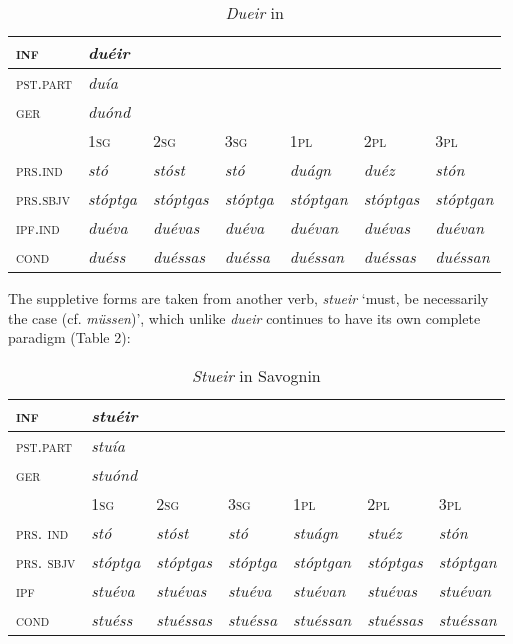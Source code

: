 \documentclass[output=paper,
modfonts
]{LSP/langsci}
\begin{document}
\begin{longtable}[]{@{}lllllll@{}}
\caption{\emph{Dueir} in }\\
\lsptoprule
\textsc{inf} & \emph{duéir} & & & & &\tabularnewline
\midrule
\endhead
\textsc{pst.part} & \emph{duía} & & & & &\tabularnewline
\textsc{ger} & \emph{duónd} & & & & &\tabularnewline
& \textsc{1sg} & \textsc{2sg} & \textsc{3sg} & \textsc{1pl} &
\textsc{2pl} & \textsc{3pl}\tabularnewline
\textsc{prs.ind} & \emph{stó} & \emph{stóst} & \emph{stó} & \emph{duágn}
& \emph{duéz} & \emph{stón}\tabularnewline
\textsc{prs.sbjv} & \emph{stóptga} & \emph{stóptgas} & \emph{stóptga} &
\emph{stóptgan} & \emph{stóptgas} & \emph{stóptgan}\tabularnewline
\textsc{ipf.ind} & \emph{duéva} & \emph{duévas} & \emph{duéva} &
\emph{duévan} & \emph{duévas} & \emph{duévan}\tabularnewline
\textsc{cond} & \emph{duéss} & \emph{duéssas} & \emph{duéssa} &
\emph{duéssan} & \emph{duéssas} & \emph{duéssan}\tabularnewline
\bottomrule
\end{longtable}

The suppletive forms are taken from another verb, \emph{stueir} `must,
be necessarily the case (cf.  \emph{müssen})', which unlike
\emph{dueir} continues to have its own complete paradigm (Table 2):


\begin{longtable}[]{@{}lllllll@{}}
\caption{\emph{Stueir} in Savognin}\\
\lsptoprule
\textsc{inf} & \emph{stuéir} & & & & &\tabularnewline
\midrule
\endhead
\textsc{pst.part} & \emph{stuía} & & & & &\tabularnewline
\textsc{ger} & \emph{stuónd} & & & & &\tabularnewline
& \textsc{1sg} & \textsc{2sg} & \textsc{3sg} & \textsc{1pl} &
\textsc{2pl} & \textsc{3pl}\tabularnewline
\textsc{prs. ind} & \emph{stó} & \emph{stóst} & \emph{stó} &
\emph{stuágn} & \emph{stuéz} & \emph{stón}\tabularnewline
\textsc{prs. sbjv} & \emph{stóptga} & \emph{stóptgas} & \emph{stóptga} &
\emph{stóptgan} & \emph{stóptgas} & \emph{stóptgan}\tabularnewline
\textsc{ipf} & \emph{stuéva} & \emph{stuévas} & \emph{stuéva} &
\emph{stuévan} & \emph{stuévas} & \emph{stuévan}\tabularnewline
\textsc{cond} & \emph{stuéss} & \emph{stuéssas} & \emph{stuéssa} &
\emph{stuéssan} & \emph{stuéssas} & \emph{stuéssan}\tabularnewline
\bottomrule
\end{longtable}
\end{document}
